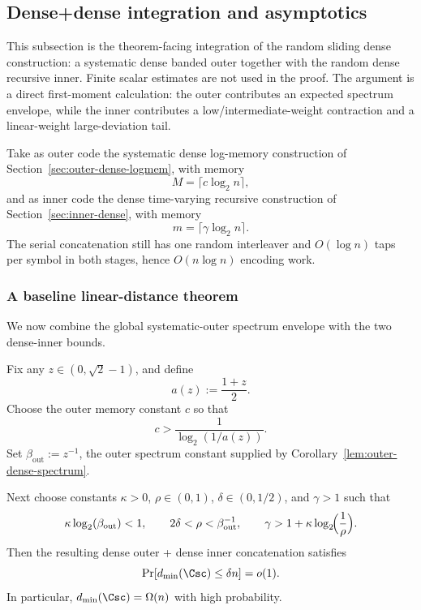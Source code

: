 \subsection{Dense+dense integration and asymptotics}
\label{sec:integrations}

This subsection is the theorem-facing integration of the random sliding dense construction:
a systematic dense banded outer together with the random dense recursive inner.
Finite scalar estimates are not used in the proof.  The argument is a direct first-moment calculation:
the outer contributes an expected spectrum envelope, while the inner contributes a low/intermediate-weight contraction
and a linear-weight large-deviation tail.

Take as outer code the systematic dense log-memory construction of
Section~\ref{sec:outer-dense-logmem}, with memory
\[
M=\lceil c\log_2 n\rceil,
\]
and as inner code the dense time-varying recursive construction of
Section~\ref{sec:inner-dense}, with memory
\[
m=\lceil \gamma \log_2 n\rceil.
\]
The serial concatenation still has one random interleaver and \(O(\log n)\) taps per symbol in both stages,
hence \(O(n\log n)\) encoding work.

\subsubsection{A baseline linear-distance theorem}
\label{sec:integration-dense-dense-baseline}

We now combine the global systematic-outer spectrum envelope with the two dense-inner bounds.

\begin{theorem}
\label{thm:dense-dense-integration}
Fix any \(z\in(0,\sqrt2-1)\), and define
\[
a(z):=\frac{1+z}{2}.
\]
Choose the outer memory constant \(c\) so that
\begin{equation}
\label{eq:dense-c-condition}
c>\frac{1}{\log_2(1/a(z))}.
\end{equation}
Set \(\beta_{\mathrm{out}}:=z^{-1}\), the outer spectrum constant supplied by
Corollary~\ref{lem:outer-dense-spectrum}.

Next choose constants \(\kappa>0\), \(\rho\in(0,1)\), \(\delta\in(0,1/2)\), and \(\gamma>1\) such that
\begin{equation}
\label{eq:dense-dense-parameter-conditions}
\kappa\log_2(\beta_{\mathrm{out}})<1,
\qquad
2\delta<\rho<\beta_{\mathrm{out}}^{-1},
\qquad
\gamma>1+\kappa\log_2\!\Bigl(\frac{1}{\rho}\Bigr).
\end{equation}
Then the resulting dense outer + dense inner concatenation satisfies
\[
\Pr[d_{\min}(\Csc)\le \delta n]=o(1).
\]
In particular, \(d_{\min}(\Csc)=\Omega(n)\) with high probability.
\end{theorem}

